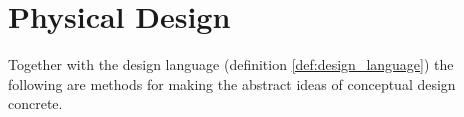 \section{Physical Design} \label{sec:physical_design}
Together with the design language (definition \ref{def:design_language}) the following are methods for making the abstract ideas of conceptual design concrete.


